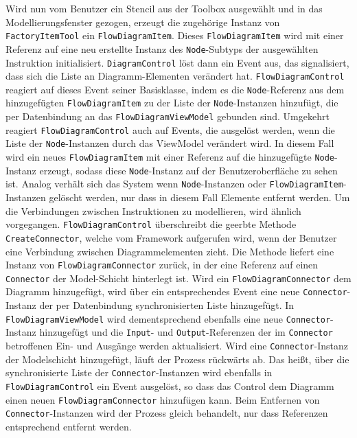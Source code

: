 Wird nun vom Benutzer ein Stencil aus der Toolbox ausgewählt und in das Modellierungsfenster gezogen, erzeugt die zugehörige Instanz von \texttt{FactoryItemTool} ein \texttt{FlowDiagramItem}. Dieses \texttt{FlowDiagramItem} wird mit einer Referenz auf eine neu erstellte Instanz des \texttt{Node}-Subtyps der ausgewählten Instruktion initialisiert. \texttt{DiagramControl} löst dann ein Event aus, das signalisiert, dass sich die Liste an Diagramm-Elementen verändert hat. \texttt{FlowDiagramControl} reagiert auf dieses Event seiner Basisklasse, indem es die \texttt{Node}-Referenz aus dem hinzugefügten \texttt{FlowDiagramItem} zu der Liste der \texttt{Node}-Instanzen hinzufügt, die per Datenbindung an das \texttt{FlowDiagramViewModel} gebunden sind. Umgekehrt reagiert \texttt{FlowDiagramControl} auch auf Events, die ausgelöst werden, wenn die Liste der \texttt{Node}-Instanzen durch das ViewModel verändert wird. In diesem Fall wird ein neues \texttt{FlowDiagramItem} mit einer Referenz auf die hinzugefügte \texttt{Node}-Instanz erzeugt, sodass diese \texttt{Node}-Instanz auf der Benutzeroberfläche zu sehen ist. Analog verhält sich das System wenn \texttt{Node}-Instanzen oder \texttt{FlowDiagramItem}-Instanzen gelöscht werden, nur dass in diesem Fall Elemente entfernt werden.
\newline
Um die Verbindungen zwischen Instruktionen zu modellieren, wird ähnlich vorgegangen. \texttt{FlowDiagramControl} überschreibt die geerbte Methode \texttt{CreateConnector}, welche vom Framework aufgerufen wird, wenn der Benutzer eine Verbindung zwischen Diagrammelementen zieht. Die Methode liefert eine Instanz von \texttt{FlowDiagramConnector} zurück, in der eine Referenz auf einen \texttt{Connector} der Model-Schicht hinterlegt ist. Wird ein \texttt{FlowDiagramConnector} dem Diagramm hinzugefügt, wird über ein entsprechendes Event eine neue \texttt{Connector}-Instanz der per Datenbindung synchronisierten Liste hinzugefügt. In \texttt{FlowDiagramViewModel} wird dementsprechend ebenfalls eine neue \texttt{Connector}-Instanz hinzugefügt und die \texttt{Input}- und \texttt{Output}-Referenzen der im \texttt{Connector} betroffenen Ein- und Ausgänge werden aktualisiert. Wird eine \texttt{Connector}-Instanz der Modelschicht hinzugefügt, läuft der Prozess rückwärts ab. Das heißt, über die synchronisierte Liste der \texttt{Connector}-Instanzen wird ebenfalls in \texttt{FlowDiagramControl} ein Event ausgelöst, so dass das Control dem Diagramm einen neuen \texttt{Flow\-Dia\-gram\-Co\-nnec\-tor} hinzufügen kann. Beim Entfernen von \texttt{Connector}-Instanzen wird der Prozess gleich behandelt, nur dass Referenzen entsprechend entfernt werden.      

